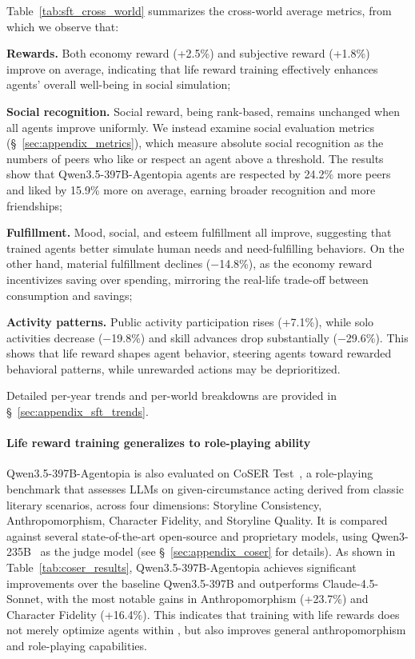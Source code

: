 Table~\ref{tab:sft_cross_world} summarizes the cross-world average metrics,
from which we observe that:
\begin{inparaenum}[\it (1)]
\item \textbf{Rewards.}
Both economy reward (+2.5\%) and subjective reward (+1.8\%) improve on average,
indicating that life reward training effectively enhances agents' overall well-being in social simulation;
\item \textbf{Social recognition.}
Social reward, being rank-based, remains unchanged when all agents improve uniformly.
We instead examine social evaluation metrics (\S~\ref{sec:appendix_metrics}), which measure absolute social recognition as the numbers of peers who like or respect an agent above a threshold.
The results show that Qwen3.5-397B-Agentopia agents are respected by 24.2\% more peers and liked by 15.9\% more on average,
earning broader recognition and more friendships;
\item \textbf{Fulfillment.}
Mood, social, and esteem fulfillment all improve,
suggesting that trained agents better simulate human needs and need-fulfilling behaviors.
On the other hand, material fulfillment declines ($-$14.8\%),
as the economy reward incentivizes saving over spending,
mirroring the real-life trade-off between consumption and savings;
\item \textbf{Activity patterns.}
Public activity participation rises (+7.1\%),
while solo activities decrease ($-$19.8\%)
and skill advances drop substantially ($-$29.6\%).
This shows that life reward shapes agent behavior, steering agents toward rewarded behavioral patterns, while unrewarded actions may be deprioritized.
\end{inparaenum}
Detailed per-year trends and per-world breakdowns are provided in \S~\ref{sec:appendix_sft_trends}.



\paragraph{Life reward training generalizes to role-playing ability}
Qwen3.5-397B-Agentopia is also evaluated on CoSER Test~\citep{wang2025coser},
a role-playing benchmark that assesses LLMs on given-circumstance acting
derived from classic literary scenarios,
across four dimensions:
Storyline Consistency, Anthropomorphism, Character Fidelity, and Storyline Quality.
It is compared against several state-of-the-art open-source and proprietary models,
using Qwen3-235B~\citep{qwen3} as the judge model
(see \S~\ref{sec:appendix_coser} for details).
As shown in Table~\ref{tab:coser_results},
Qwen3.5-397B-Agentopia achieves significant improvements over the baseline Qwen3.5-397B
and outperforms Claude-4.5-Sonnet,
with the most notable gains in Anthropomorphism (+23.7\%) and Character Fidelity (+16.4\%).
This indicates that training with life rewards does not merely optimize agents within \method,
but also improves general anthropomorphism and role-playing capabilities.


